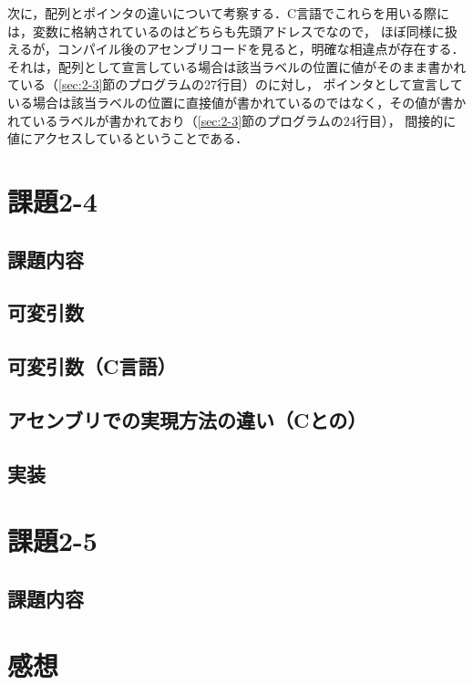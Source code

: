 \documentclass[a4j,11pt]{jarticle}
\begin{document}
次に，配列とポインタの違いについて考察する．C言語でこれらを用いる際には，変数に格納されているのはどちらも先頭アドレスでなので，
ほぼ同様に扱えるが，コンパイル後のアセンブリコードを見ると，明確な相違点が存在する．
それは，配列として宣言している場合は該当ラベルの位置に値がそのまま書かれている（\ref{sec:2-3}節のプログラムの27行目）のに対し，
ポインタとして宣言している場合は該当ラベルの位置に直接値が書かれているのではなく，その値が書かれているラベルが書かれており（\ref{sec:2-3}節のプログラムの24行目），
間接的に値にアクセスしているということである．


\section{課題2-4}
\subsection{課題内容}

\subsection{可変引数}


\subsection{可変引数（C言語）}

\subsection{アセンブリでの実現方法の違い（Cとの）}

\subsection{実装}

\section{課題2-5}

\subsection{課題内容}

\section{感想}
\end{document}
